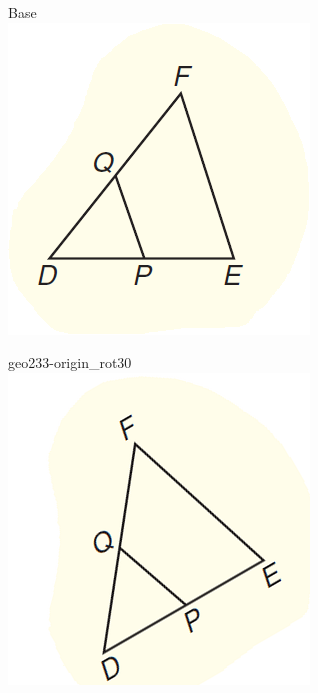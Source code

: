 \documentclass[12pt]{article}
\begin{document}
\begin{center}
\begin{minipage}{0.32\textwidth}\centering
Base\\
\includegraphics[width=0.95\linewidth]{out_rommath_origin/items/geo233-origin/assets/figure.png}
\end{minipage}
\hfill\begin{minipage}{0.32\textwidth}\centering
geo233-origin\_rot30\\
\includegraphics[width=0.95\linewidth]{out_rommath_origin/items/geo233-origin/assets/figure_rot30.png}

\end{minipage}
\end{center}
\end{document}
